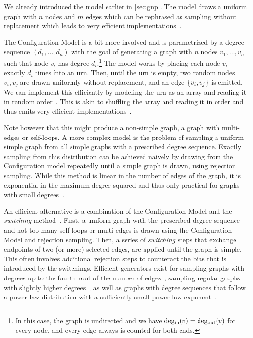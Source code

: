 We already introduced the \Gnp model earlier in \cref{sec:gnp}.
The \Gnm model draws a uniform graph with $n$ nodes and $m$ edges which can be rephrased as sampling without replacement which leads to very efficient implementations~.

The Configuration Model is a bit more involved and is parametrized by a degree sequence $(d_1, \ldots, d_n)$ with the goal of generating a graph with $n$ nodes $v_1, \ldots, v_n$ such that node $v_i$ has degree $d_i$.\footnote{
  In this case, the graph is undirected and we have $\mathrm{deg_{in}}(v) = \mathrm{deg_{out}}(v)$ for every node, and every edge always is counted for both ends. 
}
The model works by placing each node $v_i$ exactly $d_i$ times ínto an urn.
Then, until the urn is empty, two random nodes $v_i, v_j$ are drawn uniformly without replacement, and an edge $\left\{v_i, v_j\right\}$ is emitted. 
We can implement this efficiently by modeling the urn as an array and reading it in random order~\cite{DBLP:conf/alenex/Allendorf0PTW22}.
This is akin to shuffling the array and reading it in order and thus emits very efficient implementations~\cite{ParShuffle}.

Note however that this might produce a non-simple graph, \ie a graph with multi-edges or self-loops.
A more complex model is the problem of sampling a uniform simple graph from all simple graphs with a prescribed degree sequence.
Exactly sampling from this distribution can be achieved naively by drawing from the Configuration model repeatedly until a simple graph is drawn, \ie using rejection sampling.
While this method is linear in the number of edges of the graph, it is exponential in the maximum degree squared and thus only practical for graphs with small degrees~\cite{DBLP:journals/jal/Wormald84}.

An efficient alternative is a combination of the Configuration Model and the \emph{switching} method~\cite{mckay1985asymptotics,DBLP:journals/jal/McKayW90}.
First, a uniform graph with the prescribed degree sequence and not too many self-loops or multi-edges is drawn using the Configuration Model and rejection sampling.
Then, a series of \emph{switching} steps that exchange endpoints of two (or more) selected edges, are applied until the graph is simple.
This often involves additional rejection steps to counteract the bias that is introduced by the switchings.
Efficient generators exist for sampling graphs with degrees up to the fourth root of the number of edges~\cite{DBLP:journals/jal/McKayW90, DBLP:journals/rsa/ArmanGW21}, sampling regular graphs with slightly higher degrees~\cite{DBLP:journals/siamcomp/GaoW17, DBLP:journals/rsa/ArmanGW21}, as well as graphs with degree sequences that follow a power-law distribution with a sufficiently small power-law exponent~\cite{DBLP:conf/soda/GaoW18, DBLP:journals/rsa/ArmanGW21}.

